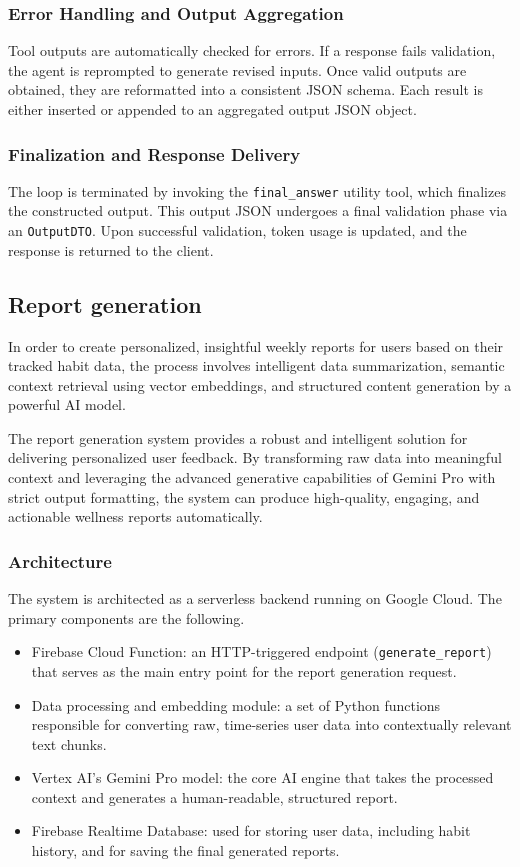 \documentclass{article}
\begin{document}
\subsubsection{Error Handling and Output Aggregation}
Tool outputs are automatically checked for errors. If a response fails validation, the agent is reprompted to generate revised inputs. Once valid outputs are obtained, they are reformatted into a consistent JSON schema. Each result is either inserted or appended to an aggregated output JSON object.

\subsubsection{Finalization and Response Delivery}
The loop is terminated by invoking the \texttt{final\_answer} utility tool, which finalizes the constructed output. This output JSON undergoes a final validation phase via an \texttt{OutputDTO}. Upon successful validation, token usage is updated, and the response is returned to the client.

\subsection{Report generation}

In order to create personalized, insightful weekly reports for users based on their tracked habit data, the process involves intelligent data summarization, semantic context retrieval using vector embeddings, and structured content generation by a powerful AI model.

The report generation system provides a robust and intelligent solution for delivering personalized user feedback.
By transforming raw data into meaningful context and leveraging the advanced generative capabilities of Gemini Pro with strict output formatting, the system can produce high-quality, engaging, and actionable wellness reports automatically.

\subsubsection{Architecture}

The system is architected as a serverless backend running on Google Cloud.
The primary components are the following.

\begin{itemize}
	\item Firebase Cloud Function: an HTTP-triggered endpoint (\verb|generate_report|) that serves as the main entry point for the report generation request.
	\item Data processing and embedding module: a set of Python functions responsible for converting raw, time-series user data into contextually relevant text chunks.
	\item Vertex AI’s Gemini Pro model: the core AI engine that takes the processed context and generates a human-readable, structured report.
	\item Firebase Realtime Database: used for storing user data, including habit history, and for saving the final generated reports.
\end{itemize}
\end{document}
